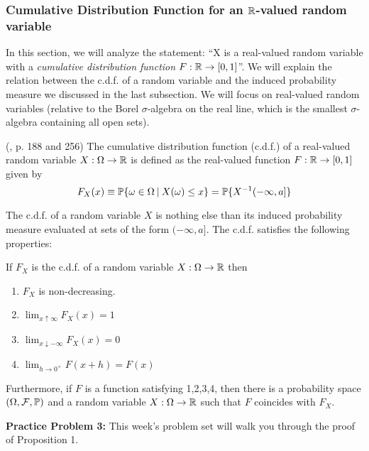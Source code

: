 \documentclass[11pt]{article} %
\begin{document}
\subsubsection{Cumulative Distribution Function for an $\mathbb{R}$-valued random variable}

In this section, we will analyze the statement: ``X is a real-valued random variable with a \emph{cumulative distribution function} $F:\mathbb{R} \rightarrow [0,1]$''. We will explain the relation between the c.d.f. of a random variable and the induced probability measure we discussed in the last subsection. We will focus on real-valued random variables (relative to the Borel $\sigma$-algebra on the real line, which is the smallest $\sigma$-algebra containing all open sets). 

\begin{definition} (\cite{Billingsley95}, p. 188 and 256)
The cumulative distribution function (c.d.f.) of a real-valued random variable $X: \Omega \rightarrow \mathbb{R}$ is defined as the real-valued function $F:\mathbb{R}\rightarrow[0,1]$ given by
$$F_{X}(x) \equiv \mathbb{P}\{ \omega \in \Omega \: | \: X(\omega) \leq x\} = \mathbb{P}\{X^{-1}(-\infty,a]\}    $$
\end{definition}

The c.d.f. of a random variable $X$ is nothing else than its induced probability measure evaluated at sets of the form $(-\infty, a]$. The c.d.f. satisfies the following properties:

\begin{proposition} If $F_{X}$ is the c.d.f. of a random variable $X: \Omega \rightarrow \mathbb{R}$ then 
\begin{enumerate}
\item $F_{X}$ is non-decreasing.
\item $\lim_{x \uparrow \infty} F_{X}(x)=1$
\item $\lim_{x \downarrow -\infty} F_{X}(x)=0$
\item $\lim_{h \rightarrow 0^{+}} F(x+h)=F(x)$
\end{enumerate}

\noindent Furthermore, if $F$ is a function satisfying 1,2,3,4, then there is a probability space $(\Omega, \mathcal{F}, \mathbb{P})$ and a random variable $X: \Omega \rightarrow \mathbb{R}$ such that $F$ coincides with $F_{X}$. 

\end{proposition}

\noindent \textbf{Practice Problem 3:} This week's problem set will walk you through the proof of Proposition 1.\\ 
\end{document}
